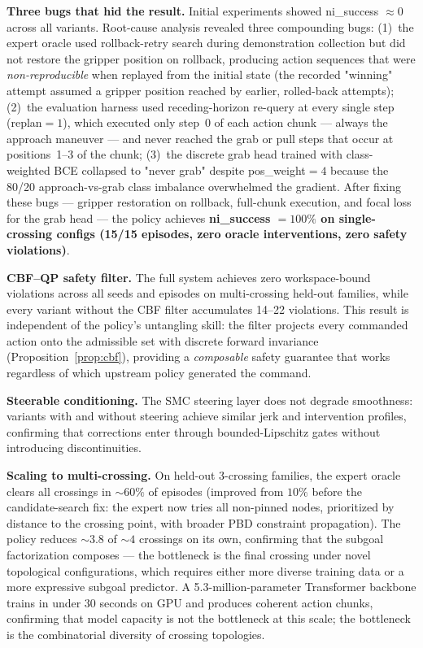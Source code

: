 \documentclass[11pt,a4paper]{article}
\begin{document}
\textbf{Three bugs that hid the result.} Initial experiments showed
ni\_success $\approx 0$ across all variants. Root-cause analysis revealed three
compounding bugs: (1)~the expert oracle used rollback-retry search during
demonstration collection but did not restore the gripper position on rollback,
producing action sequences that were \emph{non-reproducible} when replayed from
the initial state (the recorded "winning" attempt assumed a gripper position
reached by earlier, rolled-back attempts); (2)~the evaluation harness used
receding-horizon re-query at every single step (replan$=1$), which executed
only step~0 of each action chunk --- always the approach maneuver --- and never
reached the grab or pull steps that occur at positions~1--3 of the chunk;
(3)~the discrete grab head trained with class-weighted BCE collapsed to
"never grab" despite pos\_weight$=4$ because the 80/20 approach-vs-grab class
imbalance overwhelmed the gradient. After fixing these bugs --- gripper
restoration on rollback, full-chunk execution, and focal loss for the grab
head --- the policy achieves \textbf{ni\_success $= 100\%$ on single-crossing
configs (15/15 episodes, zero oracle interventions, zero safety violations)}.

\textbf{CBF--QP safety filter.} The full system achieves zero workspace-bound
violations across all seeds and episodes on multi-crossing held-out families,
while every variant without the CBF filter accumulates 14--22 violations. This
result is independent of the policy's untangling skill: the filter projects
every commanded action onto the admissible set with discrete forward invariance
(Proposition~\ref{prop:cbf}), providing a \emph{composable} safety guarantee
that works regardless of which upstream policy generated the command.

\textbf{Steerable conditioning.} The SMC steering layer does not degrade
smoothness: variants with and without steering achieve similar jerk and
intervention profiles, confirming that corrections enter through bounded-Lipschitz
gates without introducing discontinuities.

\textbf{Scaling to multi-crossing.} On held-out 3-crossing families, the expert
oracle clears all crossings in $\sim 60\%$ of episodes (improved from $10\%$
before the candidate-search fix: the expert now tries all non-pinned nodes,
prioritized by distance to the crossing point, with broader PBD constraint
propagation). The policy reduces $\sim 3.8$ of $\sim 4$ crossings on its own,
confirming that the subgoal factorization composes --- the bottleneck is the
final crossing under novel topological configurations, which requires either
more diverse training data or a more expressive subgoal predictor. A
5.3-million-parameter Transformer backbone trains in under 30 seconds on GPU
and produces coherent action chunks, confirming that model capacity is not
the bottleneck at this scale; the bottleneck is the combinatorial diversity
of crossing topologies.
\end{document}
